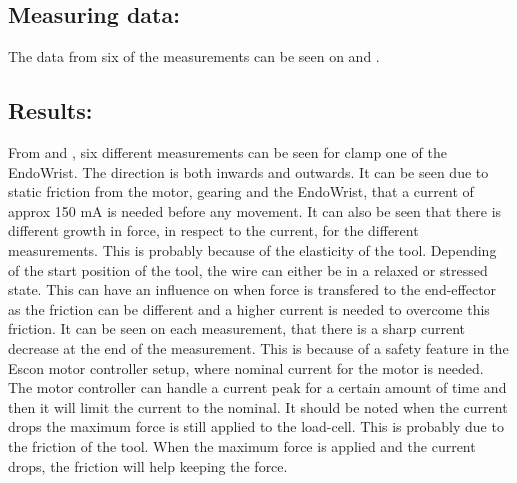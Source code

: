 \subsection*{Measuring data:}
The data from six of the measurements can be seen on  and .








\subsection*{Results:}
From  and , six different measurements can be seen for clamp one of the EndoWrist. The direction is both inwards and outwards. It can be seen due to static friction from the motor, gearing and the EndoWrist, that a current of approx 150 mA is needed before any movement. It can also be seen that there is different growth in force, in respect to the current, for the different measurements. This is probably because of the elasticity of the tool. Depending of the start position of the tool, the wire can either be in a relaxed or stressed state. This can have an influence on when force is transfered to the end-effector as the friction can be different and a higher current is needed to overcome this friction. It can be seen on each measurement, that there is a sharp current decrease at the end of the measurement. This is because of a safety feature in the Escon motor controller setup, where nominal current for the motor is needed. The motor controller can handle a current peak for a certain amount of time and then it will limit the current to the nominal. It should be noted when the current drops the maximum force is still applied to the load-cell. This is probably due to the friction of the tool. When the maximum force is applied and the current drops, the friction will help keeping the force.



